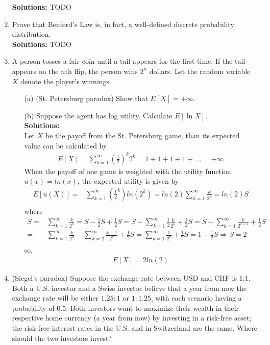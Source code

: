 \documentclass[letterpaper,12pt]{article}
\theoremstyle{definition}
\begin{document}
\begin{enumerate}
\textbf{Solutions:} TODO\\
   	\item Prove that Benford's Law is, in fact, a well-defined discrete probability distribution.\\

\textbf{Solutions:} TODO\\
   	\item A person tosses a fair coin until a tail appears for the first time. If the tail appears on the $n$th flip, the person wins $2^n$ dollars. Let the random variable $X$ denote the player's winnings.
		\begin{itemize}
			\item[(a)] (St. Petersburg paradox) Show that $E[X]= + \infty$.
			\item[(b)] Suppose the agent has log utility. Calculate $E[\ln X]$.\\
			
\textbf{Solutions:}\\
Let $X$ be the payoff from the St. Petersburg game, than its expected value can be calculated by
\begin{align*}
E[X] = \sum_{k=1}^\infty \left(\frac{1}{2} \right)^k 2^{k} =1+ 1+ 1+ 1+ \,... = +\infty
\end{align*}
When the payoff of one game is weighted with the utility function $u(x)=ln(x)$, the expected utility is given by
\begin{align*}
E[u(X)] =& \sum_{k=1}^\infty \left(\frac{1}{2}^k \right) ln(2^{k}) =  ln(2) \sum_{k=1}^\infty \frac{k}{2^k} = ln(2) S \\ 
\end{align*} where
\begin{align*}
S=& \sum_{k=1}^\infty \frac{k}{2^k} = S -\frac{1}{2}S+ \frac{1}{2}S = S-\sum_{k=1}^\infty \frac{1}{2}\frac{k}{2^k}+ \frac{1}{2}S = S-\sum_{k=1}^\infty \frac{k}{2^{k+1}}+ \frac{1}{2}S \\
=&  \sum_{k=1}^\infty \frac{k}{2^k}- \sum_{k=2}^\infty \frac{k-1}{2^{k}}+ \frac{1}{2}S = \sum^{\infty}_{k=1} \frac{1}{2^k} + \frac{1}{2}S = 1 + \frac{1}{2}S \Rightarrow S=2\\
\end{align*}
so,
\begin{align*}
E[X] = 2ln(2)
\end{align*}
		\end{itemize}
	\item (Siegel's paradox) Suppose the exchange rate between USD and CHF is 1:1. Both a U.S. investor and a Swiss investor believe that a year from now the exchange rate will be either $1.25:1$ or $1:1.25$, with each scenario having a probability of 0.5. Both investors want to maximize their wealth in their respective home currency (a year from now) by investing in a risk-free asset; the risk-free interest rates in the U.S. and in Switzerland are the same. Where should the two investors invest?


\end{enumerate}
\end{document}
